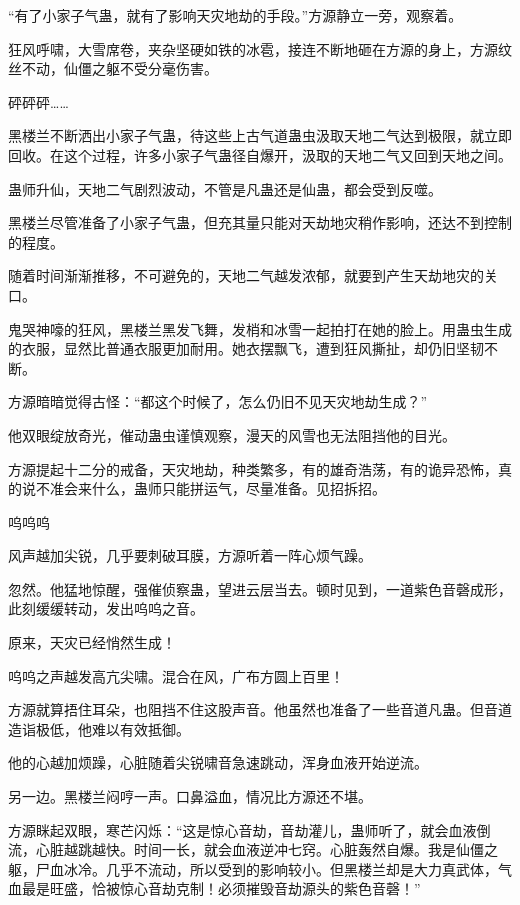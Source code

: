 
\begin{this_body}



“有了小家子气蛊，就有了影响天灾地劫的手段。”方源静立一旁，观察着。

狂风呼啸，大雪席卷，夹杂坚硬如铁的冰雹，接连不断地砸在方源的身上，方源纹丝不动，仙僵之躯不受分毫伤害。

砰砰砰……

黑楼兰不断洒出小家子气蛊，待这些上古气道蛊虫汲取天地二气达到极限，就立即回收。在这个过程，许多小家子气蛊径自爆开，汲取的天地二气又回到天地之间。

蛊师升仙，天地二气剧烈波动，不管是凡蛊还是仙蛊，都会受到反噬。

黑楼兰尽管准备了小家子气蛊，但充其量只能对天劫地灾稍作影响，还达不到控制的程度。

随着时间渐渐推移，不可避免的，天地二气越发浓郁，就要到产生天劫地灾的关口。

鬼哭神嚎的狂风，黑楼兰黑发飞舞，发梢和冰雪一起拍打在她的脸上。用蛊虫生成的衣服，显然比普通衣服更加耐用。她衣摆飘飞，遭到狂风撕扯，却仍旧坚韧不断。

方源暗暗觉得古怪：“都这个时候了，怎么仍旧不见天灾地劫生成？”

他双眼绽放奇光，催动蛊虫谨慎观察，漫天的风雪也无法阻挡他的目光。

方源提起十二分的戒备，天灾地劫，种类繁多，有的雄奇浩荡，有的诡异恐怖，真的说不准会来什么，蛊师只能拼运气，尽量准备。见招拆招。

呜呜呜

风声越加尖锐，几乎要刺破耳膜，方源听着一阵心烦气躁。

忽然。他猛地惊醒，强催侦察蛊，望进云层当去。顿时见到，一道紫色音磬成形，此刻缓缓转动，发出呜呜之音。

原来，天灾已经悄然生成！

呜呜之声越发高亢尖啸。混合在风，广布方圆上百里！

方源就算捂住耳朵，也阻挡不住这股声音。他虽然也准备了一些音道凡蛊。但音道造诣极低，他难以有效抵御。

他的心越加烦躁，心脏随着尖锐啸音急速跳动，浑身血液开始逆流。

另一边。黑楼兰闷哼一声。口鼻溢血，情况比方源还不堪。

方源眯起双眼，寒芒闪烁：“这是惊心音劫，音劫灌儿，蛊师听了，就会血液倒流，心脏越跳越快。时间一长，就会血液逆冲七窍。心脏轰然自爆。我是仙僵之躯，尸血冰冷。几乎不流动，所以受到的影响较小。但黑楼兰却是大力真武体，气血最是旺盛，恰被惊心音劫克制！必须摧毁音劫源头的紫色音磬！”


\end{this_body}
